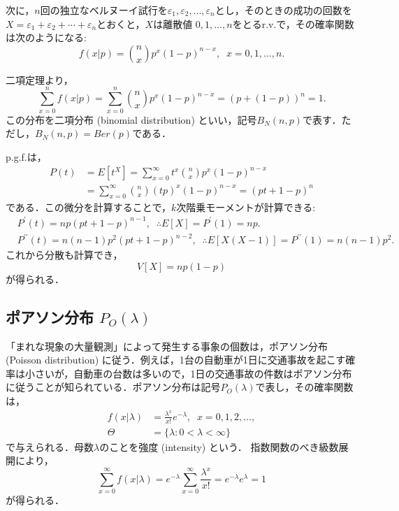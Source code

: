 \documentclass{jsreport}
\begin{document}
次に，$n$回の独立なベルヌーイ試行を$\varepsilon_1, \varepsilon_2, \ldots, \varepsilon_n$とし，そのときの成功の回数を$X = \varepsilon_1 + \varepsilon_2 + \cdots + \varepsilon_n$とおくと，$X$は離散値
$0, 1, \ldots, n$をとるr.v.で，その確率関数は次のようになる:
\begin{equation}
  f(x|p) = \binom{n}{x} p^x (1 - p)^{n - x}, \; \; x = 0, 1, \ldots, n. \nonumber
\end{equation}

二項定理より，
\begin{equation}
  \sum_{x = 0}^n f(x|p) = \sum_{x = 0}^n \binom{n}{x} p^x (1 - p)^{n - x} = (p + (1 - p))^n = 1. \nonumber
\end{equation}
この分布を二項分布 (binomial distribution) といい，記号$B_N(n, p)$で表す．ただし，$B_N(n, p) = Ber(p)$である．

p.g.f.は，
\begin{align}
  P(t) &= E[t^X] = \sum_{x = 0}^{\infty} t^x \binom{n}{x} p^x (1 - p)^{n - x} \nonumber \\
  &= \sum_{x = 0}^{\infty} \binom{n}{x} (tp)^x (1 - p)^{n - x} = (pt + 1 - p)^n \nonumber
\end{align}
である．この微分を計算することで，$k$次階乗モーメントが計算できる:
\begin{align}
  &P^{\prime}(t) = np(pt + 1 - p)^{n - 1}, \; \; \therefore E[X] = P^{\prime}(1) = np. \nonumber \\
  &P^{\prime \prime}(t) = n(n - 1)p^2(pt + 1 - p)^{n - 2}, \; \; \therefore E[X(X - 1)] = P^{\prime \prime}(1) = n(n - 1)p^2. \nonumber
\end{align}
これから分散も計算でき，
\begin{equation}
  V[X] = np(1 - p) \nonumber
\end{equation}
が得られる．

\subsection{ポアソン分布 $P_O(\lambda)$}
「まれな現象の大量観測」によって発生する事象の個数は，ポアソン分布 (Poisson distribution) に従う．例えば，1台の自動車が1日に交通事故を起こす確率は小さいが，自動車の台数は多いので，1日の交通事故の件数はポアソン分布に従うことが知られている．ポアソン分布は記号$P_O(\lambda)$で表し，その確率関数は，
\begin{align}
  f(x | \lambda) &= \frac{\lambda^x}{x!} e^{-\lambda}, \; \; x = 0, 1, 2, \ldots, \nonumber \\
  \Theta &= \{\lambda : 0 < \lambda < \infty\} \nonumber
\end{align}
で与えられる．母数$\lambda$のことを強度 (intensity) という．
指数関数のべき級数展開により，
\begin{equation}
  \sum_{x = 0}^{\infty} f(x | \lambda) = e^{-\lambda} \sum_{x = 0}^{\infty} \frac{\lambda^x}{x!} = e^{-\lambda}e^{\lambda} = 1
\end{equation}
が得られる．
\end{document}
